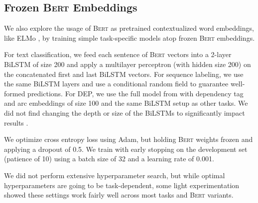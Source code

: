 \documentclass[11pt,a4paper]{article}
\newcommand{\bert}{\textsc{Bert}\xspace}
\begin{document}
\subsection{Frozen \bert Embeddings}
\label{sec:frozen}

We also explore the usage of \bert as pretrained contextualized word embeddings, like ELMo \cite{Peters2018DeepCW}, by training simple task-specific models atop frozen \bert embeddings.  

For text classification, we feed each sentence of \bert vectors into a 2-layer BiLSTM of size 200 and apply a multilayer perceptron (with hidden size 200) on the concatenated first and last BiLSTM vectors.  For sequence labeling, we use the same BiLSTM layers and use a conditional random field to guarantee well-formed predictions.  For DEP, we use the full model from \citet{Dozat2017DeepBA} with dependency tag and arc embeddings of size 100 and the same BiLSTM setup as other tasks.  We did not find changing the depth or size of the BiLSTMs to significantly impact results \cite{Reimers2017OptimalHF}.  

We optimize cross entropy loss using Adam, but holding \bert weights frozen and applying a dropout of 0.5.  We train with early stopping on the development set (patience of 10) using a batch size of 32 and a learning rate of 0.001.

We did not perform extensive hyperparameter search, but while optimal hyperparameters are going to be task-dependent, some light experimentation showed these settings work fairly well across most tasks and \bert variants.


 
\setlength{\dashlinedash}{0.2pt}
\setlength{\dashlinegap}{1.5pt}
\setlength{\arrayrulewidth}{0.4pt}
\end{document}
